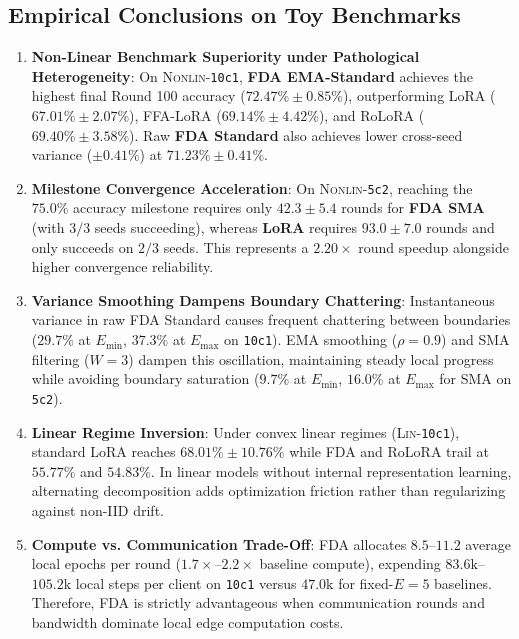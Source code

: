 \documentclass[10pt,a4paper]{article}
\begin{document}
\subsection{Empirical Conclusions on Toy Benchmarks}
\begin{enumerate}
    \item \textbf{Non-Linear Benchmark Superiority under Pathological Heterogeneity}: On \textsc{Nonlin}-\texttt{10c1}, \textbf{FDA EMA-Standard} achieves the highest final Round 100 accuracy ($72.47\% \pm 0.85\%$), outperforming LoRA ($67.01\% \pm 2.07\%$), FFA-LoRA ($69.14\% \pm 4.42\%$), and RoLoRA ($69.40\% \pm 3.58\%$). Raw \textbf{FDA Standard} also achieves lower cross-seed variance ($\pm 0.41\%$) at $71.23\% \pm 0.41\%$.
    \item \textbf{Milestone Convergence Acceleration}: On \textsc{Nonlin}-\texttt{5c2}, reaching the $75.0\%$ accuracy milestone requires only $42.3 \pm 5.4$ rounds for \textbf{FDA SMA} (with $3/3$ seeds succeeding), whereas \textbf{LoRA} requires $93.0 \pm 7.0$ rounds and only succeeds on $2/3$ seeds. This represents a $2.20\times$ round speedup alongside higher convergence reliability.
    \item \textbf{Variance Smoothing Dampens Boundary Chattering}: Instantaneous variance in raw FDA Standard causes frequent chattering between boundaries ($29.7\%$ at $E_{\min}$, $37.3\%$ at $E_{\max}$ on \texttt{10c1}). EMA smoothing ($\rho=0.9$) and SMA filtering ($W=3$) dampen this oscillation, maintaining steady local progress while avoiding boundary saturation ($9.7\%$ at $E_{\min}$, $16.0\%$ at $E_{\max}$ for SMA on \texttt{5c2}).
    \item \textbf{Linear Regime Inversion}: Under convex linear regimes (\textsc{Lin}-\texttt{10c1}), standard LoRA reaches $68.01\% \pm 10.76\%$ while FDA and RoLoRA trail at $55.77\%$ and $54.83\%$. In linear models without internal representation learning, alternating decomposition adds optimization friction rather than regularizing against non-IID drift.
    \item \textbf{Compute vs. Communication Trade-Off}: FDA allocates $8.5$--$11.2$ average local epochs per round ($1.7\times$--$2.2\times$ baseline compute), expending $83.6\text{k}$--$105.2\text{k}$ local steps per client on \texttt{10c1} versus $47.0\text{k}$ for fixed-$E=5$ baselines. Therefore, FDA is strictly advantageous when communication rounds and bandwidth dominate local edge computation costs.

\end{enumerate}
\end{document}
